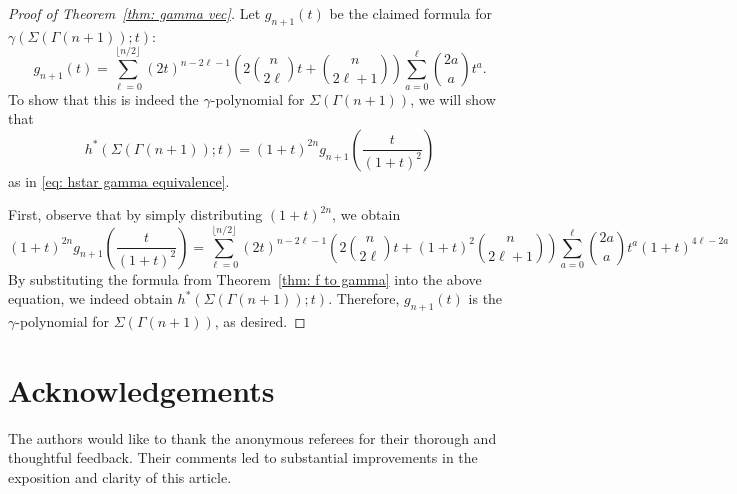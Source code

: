 \documentclass{amsart}
\numberwithin{equation}{section}
\theoremstyle{plain}
\theoremstyle{definition}
\begin{document}
\begin{proof}[Proof of Theorem~\ref{thm: gamma vec}]

Let $g_{n+1}(t)$ be the claimed formula for $\gamma(\Sigma(\Gamma(n+1));t)$:
\[
    g_{n+1}(t) = \sum_{\ell=0}^{\lfloor n/2 \rfloor}(2t)^{n-2\ell-1}\left(2\binom{n}{2\ell}t+\binom{n}{2\ell+1}\right)\sum_{a=0}^\ell\binom{2a}{a}t^a.
\]
To show that this is indeed the $\gamma$-polynomial for $\Sigma(\Gamma(n+1))$, we will show that
\[
    h^*(\Sigma(\Gamma(n+1)); t) = (1+t)^{2n}g_{n+1}\left(\frac{t}{(1+t)^2}\right)
\]
as in \eqref{eq: hstar gamma equivalence}.

First, observe that by simply distributing $(1+t)^{2n}$, we obtain
\[
    (1+t)^{2n}g_{n+1}\left(\frac{t}{(1+t)^2}\right) = \sum_{\ell=0}^{\lfloor n/2 \rfloor}(2t)^{n-2\ell-1}\left(2\binom{n}{2\ell}t+(1+t)^2\binom{n}{2\ell+1}\right)\sum_{a=0}^\ell\binom{2a}{a}t^a (1+t)^{4\ell - 2a}
\]
By substituting the formula from Theorem~\ref{thm: f to gamma} into the above equation, we indeed obtain $h^*(\Sigma(\Gamma(n+1));t)$.
Therefore, $g_{n+1}(t)$ is the $\gamma$-polynomial for $\Sigma(\Gamma(n+1))$, as desired.
\end{proof}

\section{Acknowledgements}

The authors would like to thank the anonymous referees for their thorough and thoughtful feedback.
Their comments led to substantial improvements in the exposition and clarity of this article.



\end{document}
